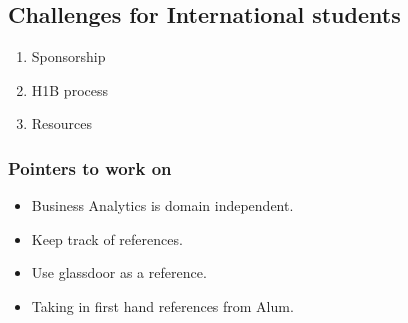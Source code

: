 \documentclass[
]{book}
\providecommand{\tightlist}{%
  \setlength{\itemsep}{0pt}\setlength{\parskip}{0pt}}
\begin{document}
\hypertarget{challenges-for-international-students}{%
\subsection{Challenges for International students}\label{challenges-for-international-students}}

\begin{enumerate}
\def\labelenumi{\arabic{enumi}.}
\tightlist
\item
  Sponsorship
\item
  H1B process
\item
  Resources
\end{enumerate}

\hypertarget{pointers-to-work-on}{%
\subsubsection{Pointers to work on}\label{pointers-to-work-on}}

\begin{itemize}
\tightlist
\item
  Business Analytics is domain independent.
\item
  Keep track of references.
\item
  Use glassdoor as a reference.
\item
  Taking in first hand references from Alum.
\end{itemize}

  
\end{document}
